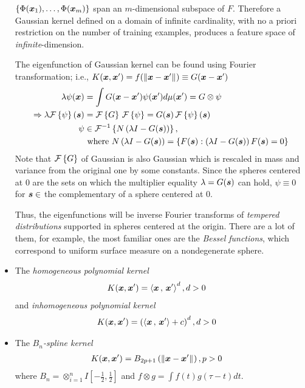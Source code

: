 \documentclass[11pt]{article}
\begin{document}
\begin{itemize}
$\left\{\Phi(\boldsymbol{x}_{1}),\ldots, \Phi(\boldsymbol{x}_{m}) \right\}$ span an $m$-dimensional subspace of $F$. Therefore a Gaussian kernel defined on a domain of infinite cardinality, with no a priori restriction on the number of training examples, produces a feature space of \emph{infinite}-dimension. 

The eigenfunction of Gaussian kernel can be found using Fourier transformation; i.e., $K(\boldsymbol{x}, \boldsymbol{x}') = f(\left\|\boldsymbol{x}-\boldsymbol{x}'\right\|_{}) \equiv G(\boldsymbol{x}-\boldsymbol{x}')$
\begin{align*}
\lambda\psi(\boldsymbol{x}) &= \int G(\boldsymbol{x} - \boldsymbol{x}')\psi(\boldsymbol{x}') d\mu(\boldsymbol{x}') = G \otimes \psi\\
\Rightarrow \lambda{\mathcal F}\left\{\psi\right\}(\boldsymbol{s}) &= {\mathcal F}\left\{G\right\}\,{\mathcal F}\left\{\psi\right\} = G(\boldsymbol{s})\,{\mathcal F}\left\{\psi\right\}(\boldsymbol{s})\\
\psi&\in {\mathcal F}^{-1}\left\{ N\left(\lambda I - G(\boldsymbol{s})\right)  \right\}, \\
&\text{ where } N\left(\lambda I - G(\boldsymbol{s})\right) = \left\{F(\boldsymbol{s}): \left(\lambda I - G(\boldsymbol{s})\right)F(\boldsymbol{s}) = 0\right\}
\end{align*}
Note that ${\mathcal F}\left\{G\right\}$ of Gaussian is also Gaussian which is rescaled in mass and variance from the original one by some constants. Since the spheres centered at $0$ are the sets on which the multiplier equality $\lambda=G(\boldsymbol{s})$ can hold, $\psi \equiv 0$ for $\boldsymbol{s}\in $ the complementary of a sphere centered at $0$.

Thus, the eigenfunctions will be inverse Fourier transforms of \emph{tempered distributions} \citep{grafakos2008classical} supported in spheres centered at the origin. There are a lot of them, for example, the most familiar ones are the \emph{Bessel functions}, which correspond to uniform surface measure on a nondegenerate sphere.
 
 
 

\item The \emph{homogeneous polynomial kernel }
 \begin{align}
K(\boldsymbol{x}, \boldsymbol{x}') &= \left\langle \boldsymbol{x}\,,\, \boldsymbol{x}' \right\rangle^{d}, d>0 \label{eqn: PolyHom_Kernel}
\end{align} and \emph{inhomogeneous polynomial kernel} 
 \begin{align}
K(\boldsymbol{x}, \boldsymbol{x}') &= \left(\left\langle \boldsymbol{x}\,,\, \boldsymbol{x}' \right\rangle+c\right)^{d}, d>0 \label{eqn: PolyInhom_Kernel}
\end{align}


\item The \emph{$B_{n}$-spline kernel}
\begin{align}
K(\boldsymbol{x}, \boldsymbol{x}') &= B_{2p+1}\left(\left\|\boldsymbol{x}-\boldsymbol{x}'\right\|_{}\right), p>0 \label{eqn: Bspline_Kernel}
\end{align}  where $B_{n} = \otimes_{i=1}^{n}I[-\frac{1}{2}, \frac{1}{2}]$ and $f\otimes g = \int f(t)g(\tau- t)dt$.\\


\end{itemize}
\end{document}
